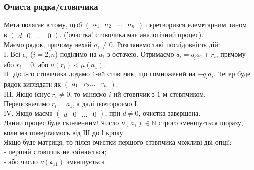 \documentclass{math_library}
\begin{document}
\subsubsection*{Очиста рядка/стовпчика}
Мета полягає в тому, щоб $\begin{pmatrix}
a_{1} & a_2 & \dots & a_n
\end{pmatrix}$ перетворився елеметарним чином в $\begin{pmatrix}
d & 0 & \dots & 0
\end{pmatrix}$. ('очистка' стовпчика має аналогічний процес).\\
Маємо рядок, причому нехай $a_1 \neq 0$. Розглянемо такі послідовність дій:\\
I. Всі $a_i$ ($i = \overline{2,n}$) поділимо на $a_1$ з остачею. Отримаємо $a_i = q_i a_1 + r_i$, причому або $r_i = 0$, або $\mu(r_i) < \mu(a_1)$.\\
II. До $i$-го стовпчика додамо $1$-ий стовпчик, що помножений на $-q_ia_i$. Тепер буде рядок виглядати як $\begin{pmatrix}
a_1 & r_2 \dots & r_n
\end{pmatrix}$.\\
III. Якщо існує $r_i \neq 0$, то міняємо $i$-ий стовпчик з $1$-м стовпчиком. Перепозначимо $r_i = a_1$, а далі повторюємо I.\\
IV. Якщо маємо $\begin{pmatrix}
d & 0 & \dots & 0
\end{pmatrix}$, при $d \neq 0$, очистка завершена.
\bigskip \\
Даний процес буде скінченним! Число $\nu(a_1) \in \mathbb{N}$ строго зменшується щоразу, коли ми повертаємось від ІІІ до І кроку.\\
Якщо буде матриця, то пілся очистки першого стовпчика можливі дві опції:\\
- перший стовпчик не змінюється;\\
- або число $\nu(a_{11})$ зменшується.
\end{document}
